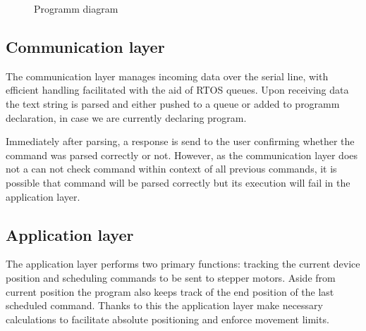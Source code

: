 \begin{figure}[h!]

  \caption[Programm diagram]{Programm diagram}
  \label{fig:code_diag}
\end{figure}

\subsection{Communication layer}

The communication layer manages incoming data over the serial line, with efficient handling facilitated with the aid of RTOS queues.
Upon receiving data the text string is parsed and either pushed to a queue or added to programm declaration, in case we are currently declaring program.

Immediately after parsing, a response is send to the user confirming whether the command was parsed correctly or not.
However, as the communication layer does not a can not check command within context of all previous commands, it is possible that command will be parsed correctly but its execution will fail in the application layer.


\subsection{Application layer}

The application layer performs two primary functions: tracking the current device position and scheduling commands to be sent to stepper motors.
Aside from current position the program also keeps track of the end position of the last scheduled command.
Thanks to this the application layer make necessary calculations to facilitate absolute positioning and enforce movement limits.


